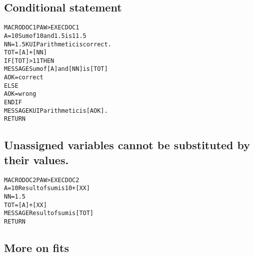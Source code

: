 \subsection*{Conditional statement}
\begin{alltt}
 MACRO DOC1                                        PAW > EXEC DOC1
   A = 10                                          Sum of 10 and 1.5 is 11.5
   NN = 1.5                                        KUIP arithmetic is correct.
   TOT = [A]+[NN]
   IF [TOT] > 11 THEN
     MESSAGE Sum of [A] and [NN] is [TOT]
     AOK = correct
   ELSE
     AOK = wrong
   ENDIF
   MESSAGE KUIP arithmetic is [AOK].
 RETURN
\end{alltt}

\clearpage
\subsection*{Unassigned variables cannot be substituted by their
  values.}
\begin{alltt}
 MACRO DOC2                                        PAW > EXEC DOC2
    A = 10                                         Result of sum is 10+[XX]
    NN = 1.5
    TOT = [A]+[XX]
    MESSAGE Result of sum is [TOT]
 RETURN
\end{alltt}

\clearpage

\subsection{More on fits}
